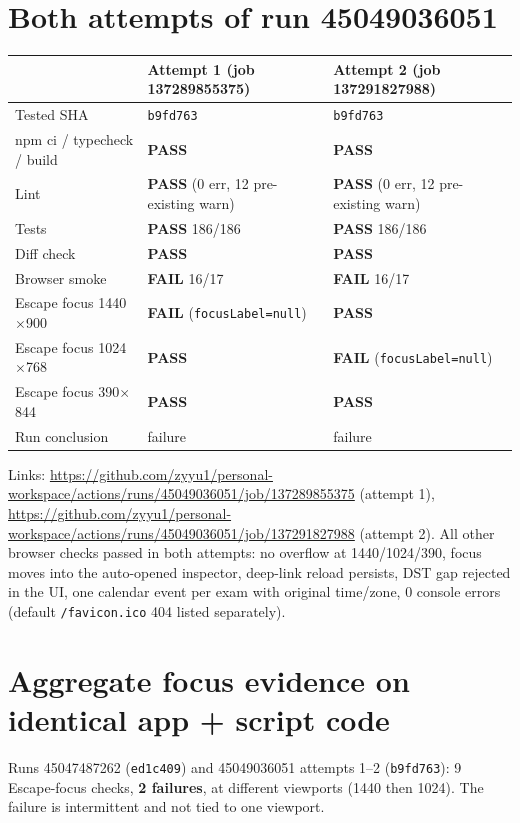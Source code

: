 \documentclass[11pt,a4paper]{article}
\newcommand{\sha}[1]{\texttt{\small #1}}
\newcommand{\PASS}{\textcolor{green!50!black}{\textbf{PASS}}}
\newcommand{\FAIL}{\textcolor{red!70!black}{\textbf{FAIL}}}
\begin{document}
\section{Both attempts of run 45049036051}
\begin{tabularx}{\textwidth}{@{}lXX@{}}
\toprule
 & Attempt 1 (job 137289855375) & Attempt 2 (job 137291827988) \\
\midrule
Tested SHA & \sha{b9fd763} & \sha{b9fd763} \\
npm ci / typecheck / build & \PASS & \PASS \\
Lint & \PASS{} (0 err, 12 pre-existing warn) & \PASS{} (0 err, 12 pre-existing warn) \\
Tests & \PASS{} 186/186 & \PASS{} 186/186 \\
Diff check & \PASS & \PASS \\
Browser smoke & \FAIL{} 16/17 & \FAIL{} 16/17 \\
Escape focus 1440$\times$900 & \FAIL{} (\texttt{focusLabel=null}) & \PASS \\
Escape focus 1024$\times$768 & \PASS & \FAIL{} (\texttt{focusLabel=null}) \\
Escape focus 390$\times$844 & \PASS & \PASS \\
Run conclusion & failure & failure \\
\bottomrule
\end{tabularx}
\medskip
Links: \url{https://github.com/zyyu1/personal-workspace/actions/runs/45049036051/job/137289855375} (attempt 1),
\url{https://github.com/zyyu1/personal-workspace/actions/runs/45049036051/job/137291827988} (attempt 2).
All other browser checks passed in both attempts: no overflow at 1440/1024/390, focus moves into the auto-opened inspector, deep-link reload persists, DST gap rejected in the UI, one calendar event per exam with original time/zone, 0 console errors (default \texttt{/favicon.ico} 404 listed separately).

\section{Aggregate focus evidence on identical app + script code}
Runs 45047487262 (\sha{ed1c409}) and 45049036051 attempts 1--2 (\sha{b9fd763}): 9 Escape-focus checks, \textbf{2 failures}, at different viewports (1440 then 1024). The failure is intermittent and not tied to one viewport.
\end{document}
